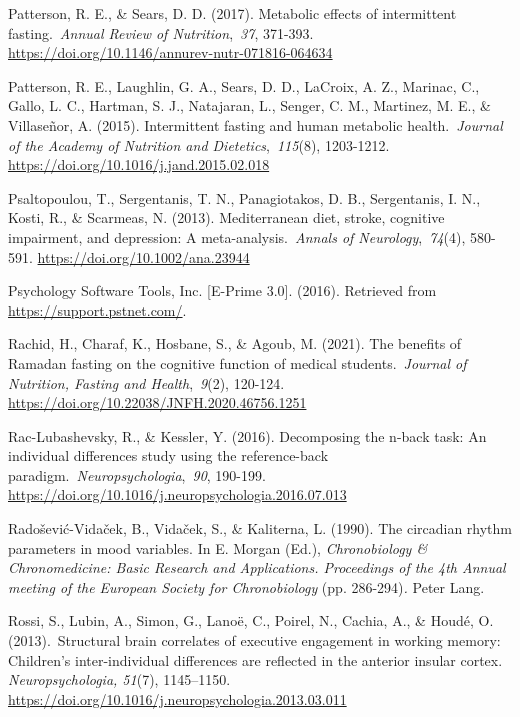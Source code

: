 \documentclass[authordate, empirical]{jote-new-article}
\begin{document}
Patterson, R. E., \& Sears, D. D. (2017). Metabolic effects of intermittent fasting. \emph{Annual Review of Nutrition}, \emph{37}, 371-393. \url{https://doi.org/10.1146/annurev-nutr-071816-064634}



Patterson, R. E., Laughlin, G. A., Sears, D. D., LaCroix, A. Z., Marinac, C., Gallo, L. C., Hartman, S. J., Natajaran, L., Senger, C. M., Martinez, M. E., \& Villaseñor, A. (2015). Intermittent fasting and human metabolic health. \emph{Journal of the Academy of Nutrition and Dietetics}, \emph{115}(8), 1203-1212. \url{https://doi.org/10.1016/j.jand.2015.02.018}



Psaltopoulou, T., Sergentanis, T. N., Panagiotakos, D. B., Sergentanis, I. N., Kosti, R., \& Scarmeas, N. (2013). Mediterranean diet, stroke, cognitive impairment, and depression: A meta-analysis. \emph{Annals of Neurology}, \emph{74}(4), 580-591. \url{https://doi.org/10.1002/ana.23944}



Psychology Software Tools, Inc. [E-Prime 3.0]. (2016). Retrieved from \href{https://support.pstnet.com/?_ga=2.129355721.472427428.1688473658-755226607.1688473658&amp;_gl=1*px0hew*_ga*NzU1MjI2NjA3LjE2ODg0NzM2NTg.*_ga_8H8T10VXZT*MTY4ODQ3MzY1OC4xLjAuMTY4ODQ3MzY1OC42MC4wLjA.}{https://support.pstnet.com/}.



Rachid, H., Charaf, K., Hosbane, S., \& Agoub, M. (2021). The benefits of Ramadan fasting on the cognitive function of medical students. \emph{Journal of Nutrition, Fasting and Health}, \emph{9}(2), 120-124. \url{https://doi.org/10.22038/JNFH.2020.46756.1251}



Rac-Lubashevsky, R., \& Kessler, Y. (2016). Decomposing the n-back task: An individual differences study using the reference-back paradigm. \emph{Neuropsychologia}, \emph{90}, 190-199. \url{https://doi.org/10.1016/j.neuropsychologia.2016.07.013}



Radošević-Vidaček, B., Vidaček, S., \& Kaliterna, L. (1990). The circadian rhythm parameters in mood variables. In E. Morgan (Ed.), \emph{Chronobiology \& Chronomedicine: Basic Research and Applications. Proceedings of the 4th Annual meeting of the European Society for Chronobiology }(pp. 286-294)\emph{. }Peter Lang.



Rossi, S., Lubin, A., Simon, G., Lanoë, C., Poirel, N., Cachia, A., \& Houdé, O. (2013). Structural brain correlates of executive engagement in working memory: Children's inter-individual differences are reflected in the anterior insular cortex.\emph{ Neuropsychologia, 51}(7), 1145--1150. \url{https://doi.org/10.1016/j.neuropsychologia.2013.03.011}
\end{document}
